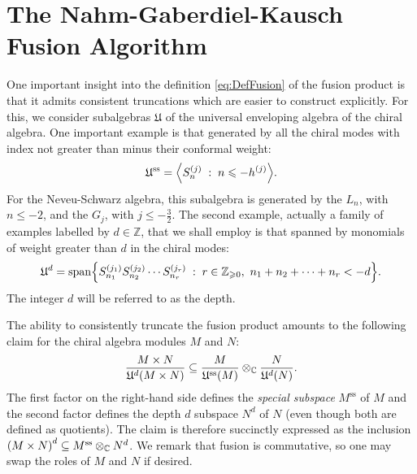 \documentclass[a4paper,reqno,12pt]{report}
\theoremstyle{definition}
\numberwithin{equation}{section}
\let\originalleft\left     %
\let\originalright\right
\renewcommand{\left}{\mathopen{}\mathclose\bgroup\originalleft}
\renewcommand{\right}{\aftergroup\egroup\originalright}
\newcommand{\alg}[1]{\mathfrak{#1}} %
\newcommand{\func}[2]{#1 \left( #2 \right)} %
\newcommand{\brac}[1]{\left( #1 \right)}
\newcommand{\set}[1]{\left\{ #1 \right\}}
\newcommand{\st}{\mspace{5mu} : \mspace{5mu}} %
\newcommand{\ZZ}{\mathbb{Z}}
\newcommand{\CC}{\mathbb{C}}
\newcommand{\spsub}[1]{#1^{\text{ss}}}       %
\newcommand{\fuse}{\mathbin{\times}}                                            %
\newcommand{\uea}{universal enveloping algebra}
\newcommand{\NGK}{Nahm-Gaberdiel-Kausch}
\newcommand{\rhs}{right-hand side}
\newcommand{\ns}{Neveu-Schwarz}
\DeclareMathOperator{\vspn}{span}
\renewcommand{\ge}{\geqslant}
\renewcommand{\le}{\leqslant}
\theoremstyle{plain}
\begin{document}
\section{The \NGK{} Fusion Algorithm} \label{app:NGK}

One important insight \cite{NahQua94,GabInd96} into the definition \eqref{eq:DefFusion} of the fusion product is that it admits consistent truncations which are easier to construct explicitly.  For this, we consider subalgebras $\alg{U}$ of the \uea{} of the chiral algebra.  One important example is that generated by all the chiral modes with index not greater than minus their conformal weight:
\begin{equation}
\spsub{\alg{U}} = \left\langle S^{(j)}_n \st n \le -h^{(j)} \right\rangle.
\end{equation}
For the \ns{} algebra, this subalgebra is generated by the $L_n$, with $n \le -2$, and the $G_j$, with $j \le -\frac{3}{2}$.  The second example, actually a family of examples labelled by $d \in \ZZ$, that we shall employ is that spanned by monomials of weight greater than $d$ in the chiral modes:
\begin{equation}
\alg{U}^d = \vspn \set{S^{(j_1)}_{n_1} S^{(j_2)}_{n_2} \cdots S^{(j_r)}_{n_r} \st r \in \ZZ_{\ge 0}, \ n_1 + n_2 + \cdots + n_r < -d}.
\end{equation}
The integer $d$ will be referred to as the depth.

The ability to consistently truncate the fusion product amounts to the following claim \cite{NahQua94,GabInd96} for the chiral algebra modules $M$ and $N$:
\begin{equation} \label{eq:NGKClaim}
\frac{M \fuse N}{\func{\alg{U}^d}{M \fuse N}} \subseteq \frac{M}{\func{\spsub{\alg{U}}}{M}} \otimes_{\CC} \frac{N}{\func{\alg{U}^d}{N}}.
\end{equation}
The first factor on the \rhs{} defines the \emph{special subspace} $\spsub{M}$ of $M$ and the second factor defines the depth $d$ subspace $N^d$ of $N$ (even though both are defined as quotients).  The claim is therefore succinctly expressed as the inclusion $\brac{M \fuse N}^d \subseteq \spsub{M} \otimes_{\CC} N^d$.  We remark that fusion is commutative, so one may swap the roles of $M$ and $N$ if desired.
\end{document}
